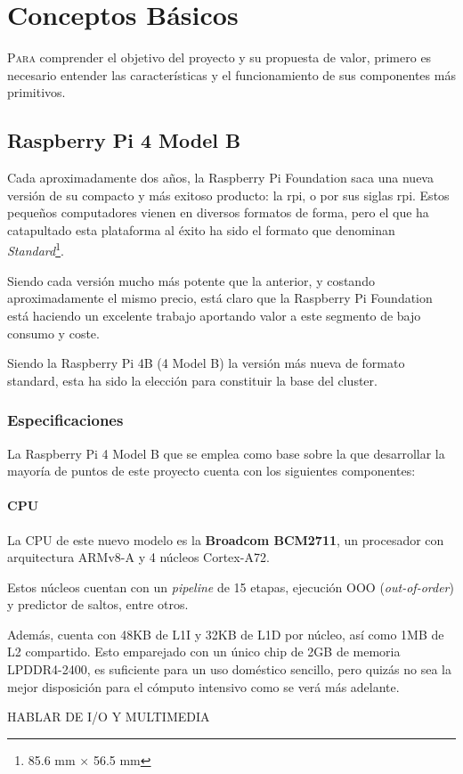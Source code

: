 \chapter{Conceptos Básicos}
\label{chap:conceptos_basicos}

\lettrine{P}{ara} comprender el objetivo del proyecto y su propuesta de valor, primero es necesario entender las características y el funcionamiento de sus componentes más primitivos.

\section{Raspberry Pi 4 Model B}
Cada aproximadamente dos años, la Raspberry Pi Foundation saca una nueva versión de su compacto y más exitoso producto: la \acrlong{rpi}, o por sus siglas \acrshort{rpi}. Estos pequeños computadores vienen en diversos formatos de forma, pero el que ha catapultado esta plataforma al éxito ha sido el formato que denominan \textit{Standard}\footnote{85.6 mm × 56.5 mm}.


Siendo cada versión mucho más potente que la anterior, y costando aproximadamente el mismo precio, está claro que la Raspberry Pi Foundation está haciendo un excelente trabajo aportando valor a este segmento de bajo consumo y coste.

Siendo la Raspberry Pi 4B (4 Model B) la versión más nueva de formato standard, esta ha sido la elección para constituir la base del cluster.

\subsection{Especificaciones}
La Raspberry Pi 4 Model B que se emplea como base sobre la que desarrollar la mayoría de puntos de este proyecto cuenta con los siguientes componentes:

\subsubsection{CPU}
La CPU de este nuevo modelo es la \textbf{Broadcom BCM2711}, un procesador con arquitectura ARMv8-A y 4 núcleos Cortex-A72.

Estos núcleos cuentan con un \textit{pipeline} de 15 etapas, ejecución OOO (\textit{out-of-order}) y predictor de saltos, entre otros.

Además, cuenta con 48KB de L1I y 32KB de L1D por núcleo, así como 1MB de L2 compartido. Esto emparejado con un único chip de 2GB de memoria LPDDR4-2400, es suficiente para un uso doméstico sencillo, pero quizás no sea la mejor disposición para el cómputo intensivo como se verá más adelante. %

HABLAR DE I/O Y MULTIMEDIA